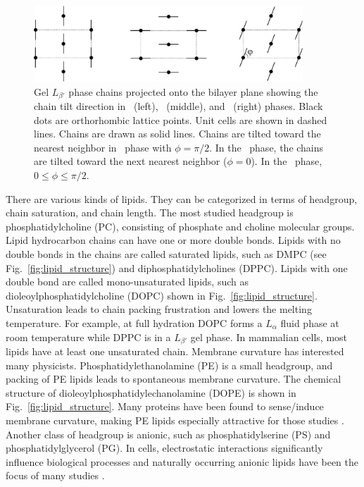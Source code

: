 \begin{figure}[htbp]
  \centering
  \includegraphics[width=0.9\textwidth]{figures/gel_phase_packing}
  \caption[Gel $L_{\beta'}$ phase chains projected onto the bilayer plane showing 
  the chain tilt direction in \LbetaI\ (left), \LbetaF\ (middle), and
  \LbetaL\ (right) phases]
  {Gel $L_{\beta'}$ phase chains projected onto the bilayer plane showing 
  the chain tilt direction in \LbetaI\ (left), \LbetaF\ (middle), and
  \LbetaL\ (right) phases. Black dots are orthorhombic lattice points.
  Unit cells are shown in dashed lines.
  Chains are drawn as solid lines. Chains are tilted toward the
  nearest neighbor in \LbetaI\ phase with $\phi=\pi/2$. 
  In the \LbetaF\ phase, the chains are tilted toward the next nearest neighbor
  ($\phi=0$). In the \LbetaL\ phase, $0 \leq \phi \leq \pi/2$.}
  \label{fig:gel_phase_packing}
\end{figure}

There are various kinds of lipids. They can be 
categorized in terms of headgroup, chain saturation, and chain length.
The most studied headgroup is phosphatidylcholine (\gls{PC}),
consisting of phosphate and choline molecular groups. 
Lipid hydrocarbon chains can have one or more double bonds. 
Lipids
with no double bonds in the chains are called saturated lipids,
such as DMPC (see Fig.~\ref{fig:lipid_structure}) and diphosphatidylcholines (\gls{DPPC}). 
Lipids with one double bond
are called mono-unsaturated lipids, such as dioleoylphosphatidylcholine (\gls{DOPC}) shown in Fig.~\ref{fig:lipid_structure}.
Unsaturation leads to chain packing frustration and lowers the melting 
temperature. 
For example, at full hydration DOPC forms a $L_{\alpha}$ fluid phase at room temperature
while DPPC is in a $L_{\beta'}$ gel phase.
In mammalian cells, most lipids have at least one unsaturated chain.
Membrane curvature has interested many physicists. 
Phosphatidylethanolamine (\gls{PE}) is a small 
headgroup, and packing of PE lipids leads to spontaneous membrane curvature.
The chemical structure of dioleoylphosphatidylechanolamine (\gls{DOPE}) is shown in Fig.~\ref{fig:lipid_structure}.
Many proteins have been found to sense/induce membrane curvature, 
making PE lipids especially attractive for those studies \cite{ref:Chernomordik03}.
Another class of headgroup is
anionic, such as phosphatidylserine (PS) and phosphatidylglycerol (PG). 
In cells, electrostatic interactions
significantly influence biological processes and naturally occurring anionic
lipids have been the focus of many studies \cite{ref:Dowhan97}.


